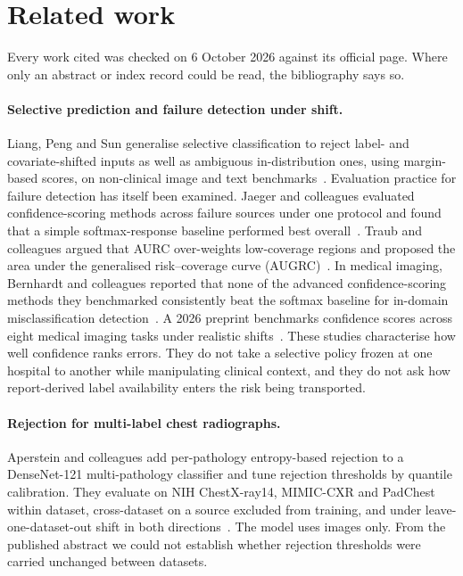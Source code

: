 \section{Related work}
\label{sec:related}

Every work cited was checked on 6 October 2026 against its official page.
Where only an abstract or index record could be read, the bibliography says so.

\paragraph{Selective prediction and failure detection under shift.}
Liang, Peng and Sun generalise selective classification to reject label- and
covariate-shifted inputs as well as ambiguous in-distribution ones, using
margin-based scores, on non-clinical image and text
benchmarks~\cite{liang2024selective}.
Evaluation practice for failure detection has itself been examined. Jaeger and
colleagues evaluated confidence-scoring methods across failure sources under one
protocol and found that a simple softmax-response baseline performed best
overall~\cite{jaeger2023call}. Traub and colleagues
argued that AURC over-weights low-coverage regions and proposed the area under
the generalised risk--coverage curve (AUGRC)~\cite{traub2024augrc}. In medical
imaging, Bernhardt and colleagues reported that none of the advanced
confidence-scoring methods they benchmarked consistently beat the softmax
baseline for in-domain misclassification detection~\cite{bernhardt2022failure}.
A 2026 preprint benchmarks confidence scores across eight medical imaging tasks
under realistic shifts~\cite{steinmetz2026failure}. These studies characterise
how well confidence ranks errors. They do not take a selective policy frozen at
one hospital to another while manipulating clinical context, and they do not
ask how report-derived label availability enters the risk being transported.

\paragraph{Rejection for multi-label chest radiographs.}
Aperstein and colleagues add per-pathology entropy-based rejection to a
DenseNet-121 multi-pathology classifier and tune rejection thresholds by
quantile calibration. They evaluate on NIH ChestX-ray14, MIMIC-CXR and PadChest
within dataset, cross-dataset on a source excluded from training, and under
leave-one-dataset-out shift in both directions~\cite{aperstein2025rejection}.
The model uses images only. From the published abstract we could not establish
whether rejection thresholds were carried unchanged between datasets.

